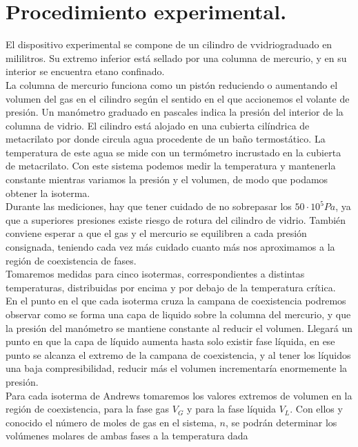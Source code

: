 \documentclass[a4paper,12pt,spanish]{article}
\begin{document}
	
	
	\section{Procedimiento experimental.}
	
	El dispositivo experimental se compone de un cilindro de vvidriograduado en mililitros. Su extremo inferior está sellado por una columna de mercurio, y en su interior se encuentra etano confinado.\\
	
	La columna de mercurio funciona como un pistón reduciendo o aumentando el volumen del gas en el cilindro según el sentido en el que accionemos el volante de presión. Un manómetro graduado en pascales indica la presión del interior de la columna de vidrio. El cilindro está alojado en una cubierta cilíndrica de metacrilato por donde circula agua procedente de un baño termostático. La temperatura de este agua se mide con un termómetro incrustado en la cubierta de metacrilato. Con este sistema podemos medir la temperatura y mantenerla constante mientras variamos la presión y el volumen, de modo que podamos obtener la isoterma.\\
	
	Durante las mediciones, hay que tener cuidado de no sobrepasar los $50\cdot 10^5 \si{Pa}$, ya que a superiores presiones existe riesgo de rotura del cilindro de vidrio. También conviene esperar a que el gas y el mercurio se equilibren a cada presión consignada, teniendo cada vez más cuidado cuanto más nos aproximamos a la región de coexistencia de fases.\\
	
	Tomaremos medidas para cinco isotermas, correspondientes a distintas temperaturas, distribuidas por encima y por debajo de la temperatura crítica.\\
	
	En el punto en el que cada isoterma cruza la campana de coexistencia podremos observar como se forma una capa de liquido sobre la columna del mercurio, y que la presión del manómetro se mantiene constante al reducir el volumen. Llegará un punto en que la capa de líquido aumenta hasta solo existir fase líquida, en ese punto se alcanza el extremo de la campana de coexistencia, y al tener los líquidos una baja compresibilidad, reducir más el volumen incrementaría enormemente la presión.\\
	
	Para cada isoterma de Andrews tomaremos los valores extremos de volumen en la región de coexistencia, para la fase gas $V_G$ y para la fase líquida $V_L$. Con ellos y conocido el número de moles de gas en el sistema, $n$, se podrán determinar los volúmenes molares de ambas fases a la temperatura dada
	
\end{document}
